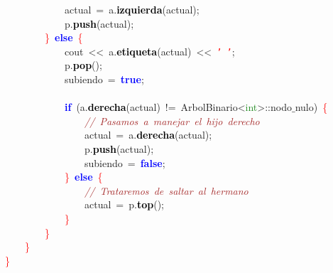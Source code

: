 \mbox{}\ \ \ \ \ \ \ \ \ \ \ \ actual\ \textcolor{BrickRed}{=}\ a\textcolor{BrickRed}{.}\textbf{\textcolor{Black}{izquierda}}\textcolor{BrickRed}{(}actual\textcolor{BrickRed}{);} \\
\mbox{}\ \ \ \ \ \ \ \ \ \ \ \ p\textcolor{BrickRed}{.}\textbf{\textcolor{Black}{push}}\textcolor{BrickRed}{(}actual\textcolor{BrickRed}{);} \\
\mbox{}\ \ \ \ \ \ \ \ \textcolor{Red}{\}}\ \textbf{\textcolor{Blue}{else}}\ \textcolor{Red}{\{} \\
\mbox{}\ \ \ \ \ \ \ \ \ \ \ \ cout\ \textcolor{BrickRed}{\textless{}\textless{}}\ a\textcolor{BrickRed}{.}\textbf{\textcolor{Black}{etiqueta}}\textcolor{BrickRed}{(}actual\textcolor{BrickRed}{)}\ \textcolor{BrickRed}{\textless{}\textless{}}\ \texttt{\textcolor{Red}{'\ '}}\textcolor{BrickRed}{;} \\
\mbox{}\ \ \ \ \ \ \ \ \ \ \ \ p\textcolor{BrickRed}{.}\textbf{\textcolor{Black}{pop}}\textcolor{BrickRed}{();} \\
\mbox{}\ \ \ \ \ \ \ \ \ \ \ \ subiendo\ \textcolor{BrickRed}{=}\ \textbf{\textcolor{Blue}{true}}\textcolor{BrickRed}{;} \\
\mbox{}\ \ \ \ \ \ \ \ \ \ \ \  \\
\mbox{}\ \ \ \ \ \ \ \ \ \ \ \ \textbf{\textcolor{Blue}{if}}\ \textcolor{BrickRed}{(}a\textcolor{BrickRed}{.}\textbf{\textcolor{Black}{derecha}}\textcolor{BrickRed}{(}actual\textcolor{BrickRed}{)}\ \textcolor{BrickRed}{!=}\ ArbolBinario\textcolor{BrickRed}{\textless{}}\textcolor{ForestGreen}{int}\textcolor{BrickRed}{\textgreater{}::}nodo$\_$nulo\textcolor{BrickRed}{)}\ \textcolor{Red}{\{} \\
\mbox{}\ \ \ \ \ \ \ \ \ \ \ \ \ \ \ \ \textit{\textcolor{Brown}{//\ Pasamos\ a\ manejar\ el\ hijo\ derecho}} \\
\mbox{}\ \ \ \ \ \ \ \ \ \ \ \ \ \ \ \ actual\ \textcolor{BrickRed}{=}\ a\textcolor{BrickRed}{.}\textbf{\textcolor{Black}{derecha}}\textcolor{BrickRed}{(}actual\textcolor{BrickRed}{);} \\
\mbox{}\ \ \ \ \ \ \ \ \ \ \ \ \ \ \ \ p\textcolor{BrickRed}{.}\textbf{\textcolor{Black}{push}}\textcolor{BrickRed}{(}actual\textcolor{BrickRed}{);} \\
\mbox{}\ \ \ \ \ \ \ \ \ \ \ \ \ \ \ \ subiendo\ \textcolor{BrickRed}{=}\ \textbf{\textcolor{Blue}{false}}\textcolor{BrickRed}{;} \\
\mbox{}\ \ \ \ \ \ \ \ \ \ \ \ \textcolor{Red}{\}}\ \textbf{\textcolor{Blue}{else}}\ \textcolor{Red}{\{}\  \\
\mbox{}\ \ \ \ \ \ \ \ \ \ \ \ \ \ \ \ \textit{\textcolor{Brown}{//\ Trataremos\ de\ saltar\ al\ hermano}} \\
\mbox{}\ \ \ \ \ \ \ \ \ \ \ \ \ \ \ \ actual\ \textcolor{BrickRed}{=}\ p\textcolor{BrickRed}{.}\textbf{\textcolor{Black}{top}}\textcolor{BrickRed}{();} \\
\mbox{}\ \ \ \ \ \ \ \ \ \ \ \ \textcolor{Red}{\}} \\
\mbox{}\ \ \ \ \ \ \ \ \textcolor{Red}{\}} \\
\mbox{}\ \ \ \ \textcolor{Red}{\}} \\
\mbox{}\textcolor{Red}{\}}
